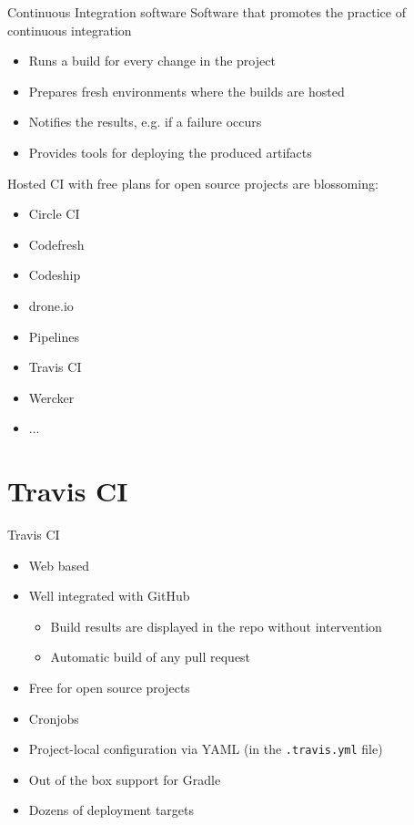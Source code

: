 \documentclass[presentation]{beamer}
\begin{document}
\begin{frame}[fragile]{Continuous Integration software}
	Software that promotes the practice of continuous integration
	\begin{itemize}
		\item Runs a build for every change in the project
		\item Prepares fresh environments where the builds are hosted
		\item Notifies the results, e.g. if a failure occurs
		\item Provides tools for deploying the produced artifacts
	\end{itemize}
	Hosted CI with free plans for open source projects are blossoming:
	\scriptsize
	\begin{itemize}
		\item Circle CI
		\item Codefresh
		\item Codeship
		\item drone.io
		\item Pipelines
		\item Travis CI
		\item Wercker
		\item ...
	\end{itemize}
\end{frame}

\section{Travis CI}

\begin{frame}[fragile]{Travis CI}
	\begin{itemize}
		\item Web based
		\item Well integrated with GitHub
		\begin{itemize}
			\item Build results are displayed in the repo without intervention
			\item Automatic build of any pull request
		\end{itemize}
		\item Free for open source projects
		\item Cronjobs
		\item Project-local configuration via YAML (in the \texttt{.travis.yml} file)
		\item Out of the box support for Gradle
		\item Dozens of deployment targets
	\end{itemize}
\end{frame}
\end{document}
